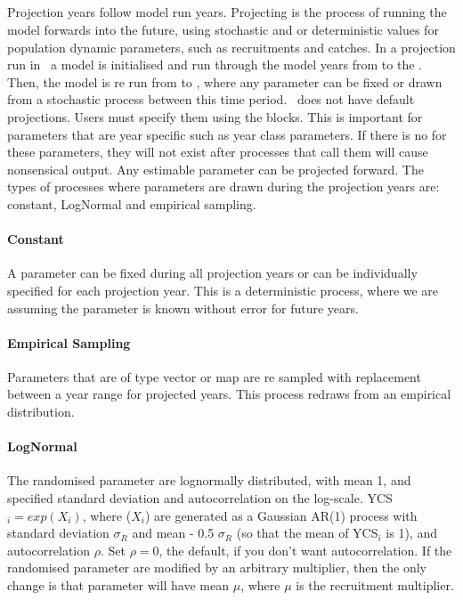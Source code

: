 \subsection{}\label{sec:projection}
Projection years follow model run years. Projecting is the process of running the model forwards into the future, using stochastic and or deterministic values for population dynamic parameters, such as recruitments and catches. In a projection run in \CNAME\, a model is initialised and run through the model years from  to the . Then, the model is re run from  to , where any parameter can be fixed or drawn from a stochastic process between this time period. \CNAME\ does not have default projections. Users must specify them using the  blocks. This is important for parameters that are year specific such as year class parameters. If there is no  for these parameters, they will not exist after  processes that call them will cause nonsensical output. Any estimable parameter can be projected forward. The types of processes where parameters are drawn during the projection years are: constant, LogNormal and empirical sampling.

\paragraph*{Constant}
A parameter can be fixed during all projection years or can be individually specified for each projection year. This is a deterministic process, where we are assuming the parameter is known without error for future years.

\paragraph*{Empirical Sampling}
Parameters that are of type vector or map are re sampled with replacement between a year range for projected years. This process redraws from an empirical distribution.
\paragraph*{LogNormal}
The randomised parameter are lognormally distributed, with mean 1, and specified standard deviation and autocorrelation on the log-scale. YCS$_i=exp(X_i)$, where ($X_i$) are generated as a Gaussian AR(1) process with standard deviation $\sigma_R$ and mean - 0.5 $\sigma_R$ (so that the mean of YCS$_i$ is 1), and autocorrelation $\rho$. Set $\rho=0$, the default, if you don’t want autocorrelation. If the randomised parameter are modified by an arbitrary multiplier, then the only change is that parameter will have mean $\mu$, where $\mu$ is the recruitment multiplier.

